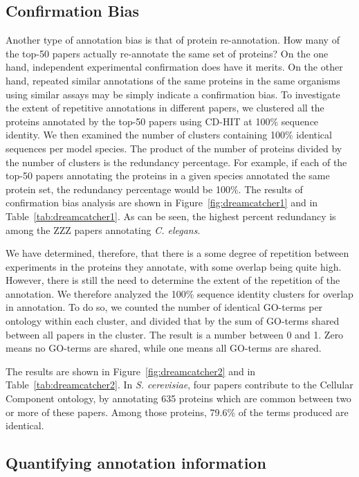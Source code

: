 \documentclass[10pt]{article}
\begin{document}
\subsection*{Confirmation Bias}

Another type of annotation bias is that of protein re-annotation. How many of the top-50 papers
actually re-annotate the same set of proteins? On the one hand, independent experimental
confirmation does have it merits. On the other hand, repeated similar annotations of the same
proteins in the same organisms using similar assays may be simply indicate a confirmation bias.
To investigate the extent of repetitive annotations in different papers, we clustered all the
proteins annotated by the top-50 papers using CD-HIT\cite{CD_HIT} at 100\% sequence identity. We
then examined the number of clusters containing 100\% identical sequences per model species. The
product of the number of proteins divided by the number of clusters is the redundancy
percentage. For example, if each of the top-50 papers annotating the proteins in a given species
annotated the same protein set, the redundancy percentage would be 100\%. The results of
confirmation bias analysis are shown in Figure~\ref{fig:dreamcatcher1} and in
Table~\ref{tab:dreamcatcher1}. As can be seen, the highest percent redundancy is among the ZZZ
papers annotating {\em C. elegans}. 

We have determined, therefore, that there is a some degree of repetition between experiments in
the proteins they annotate, with some overlap being quite high. However, there is still the
need to determine the extent of the repetition of the annotation. We therefore analyzed the
100\% sequence identity clusters for overlap in annotation.  To do so, we counted the number
of identical GO-terms per ontology within each cluster, and divided that by the sum of
GO-terms shared between all papers in the cluster. The result is a number between 0 and 1.
Zero means no GO-terms are shared, while one means all GO-terms are shared. 

The results are shown in Figure~\ref{fig:dreamcatcher2} and in
Table~\ref{tab:dreamcatcher2}. In \textit{S.  cerevisiae}, four papers contribute to the
Cellular Component ontology, by annotating 635 proteins which are common between two or more
of these papers. Among those proteins,  79.6\% of the terms produced are identical.

\subsection*{Quantifying annotation information}
\end{document}
